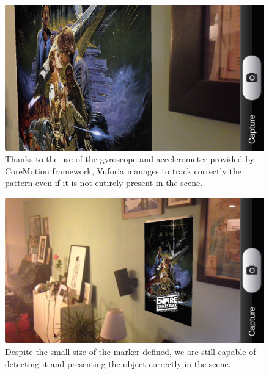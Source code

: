 \begin{figure}
\centering
\includegraphics[scale=0.3]{img/track03.JPG}
\caption{\label{fig:track03} Thanks to the use of the gyroscope and accelerometer
  provided by CoreMotion framework, Vuforia manages to track correctly the pattern
  even if it is not entirely present in the scene.}
\end{figure} 

\begin{figure}
\centering
\includegraphics[scale=0.3]{img/track04.JPG}
\caption{\label{fig:track04} Despite the small size of the marker defined, we are
  still capable of detecting it and presenting the object correctly in the scene.}
\end{figure} 
